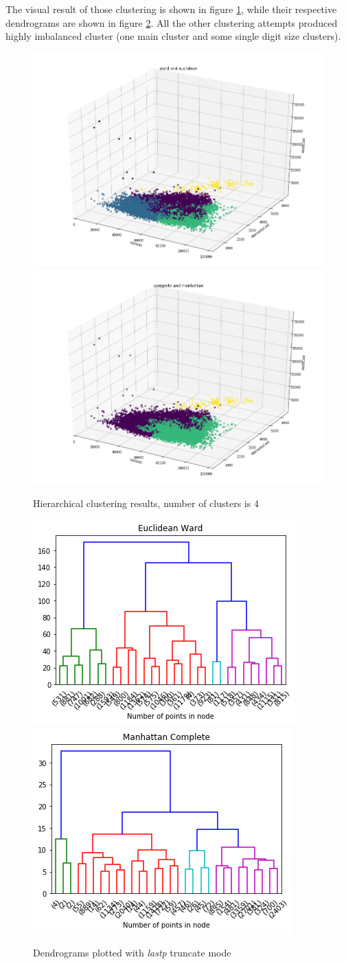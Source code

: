 \documentclass{article}
\begin{document}
The visual result of those clustering is shown in figure \ref{fig:hier}, while their respective dendrograms are shown in figure \ref{fig:dend}. All the other clustering attempts produced highly imbalanced cluster (one main cluster and some single digit size clusters).
\begin{figure}[H]
\centering
\includegraphics[width=.49\textwidth]{wardeucl}\hfill
\includegraphics[width=.49\textwidth]{complman}\hfill
\caption{Hierarchical clustering results, number of clusters is 4}
\label{fig:hier}
\end{figure}
\begin{figure}[H]
\centering
\includegraphics[width=.49\textwidth]{dendeuc}\hfill
\includegraphics[width=.49\textwidth]{dendman}\hfill
\caption{Dendrograms plotted with \emph{lastp} truncate mode}
\label{fig:dend}
\end{figure}
\end{document}
